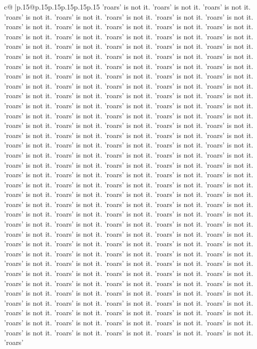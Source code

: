 \documentclass{article}
\begin{document}
{\begin{supertabular}{c@{$\;$}|p{.15\linewidth}@{}p{.15\linewidth}p{.15\linewidth}p{.15\linewidth}p{.15\linewidth}p{.15\linewidth}}
{{{'roars' is not it. 'roars' is not it. 'roars' is not it. 'roars' is not it. 'roars' is not it. 'roars' is not it. 'roars' is not it. 'roars' is not it. 'roars' is not it. 'roars' is not it. 'roars' is not it. 'roars' is not it. 'roars' is not it. 'roars' is not it. 'roars' is not it. 'roars' is not it. 'roars' is not it. 'roars' is not it. 'roars' is not it. 'roars' is not it. 'roars' is not it. 'roars' is not it. 'roars' is not it. 'roars' is not it. 'roars' is not it. 'roars' is not it. 'roars' is not it. 'roars' is not it. 'roars' is not it. 'roars' is not it. 'roars' is not it. 'roars' is not it. 'roars' is not it. 'roars' is not it. 'roars' is not it. 'roars' is not it. 'roars' is not it. 'roars' is not it. 'roars' is not it. 'roars' is not it. 'roars' is not it. 'roars' is not it. 'roars' is not it. 'roars' is not it. 'roars' is not it. 'roars' is not it. 'roars' is not it. 'roars' is not it. 'roars' is not it. 'roars' is not it. 'roars' is not it. 'roars' is not it. 'roars' is not it. 'roars' is not it. 'roars' is not it. 'roars' is not it. 'roars' is not it. 'roars' is not it. 'roars' is not it. 'roars' is not it. 'roars' is not it. 'roars' is not it. 'roars' is not it. 'roars' is not it. 'roars' is not it. 'roars' is not it. 'roars' is not it. 'roars' is not it. 'roars' is not it. 'roars' is not it. 'roars' is not it. 'roars' is not it. 'roars' is not it. 'roars' is not it. 'roars' is not it. 'roars' is not it. 'roars' is not it. 'roars' is not it. 'roars' is not it. 'roars' is not it. 'roars' is not it. 'roars' is not it. 'roars' is not it. 'roars' is not it. 'roars' is not it. 'roars' is not it. 'roars' is not it. 'roars' is not it. 'roars' is not it. 'roars' is not it. 'roars' is not it. 'roars' is not it. 'roars' is not it. 'roars' is not it. 'roars' is not it. 'roars' is not it. 'roars' is not it. 'roars' is not it. 'roars' is not it. 'roars' is not it. 'roars' is not it. 'roars' is not it. 'roars' is not it. 'roars' is not it. 'roars' is not it. 'roars' is not it. 'roars' is not it. 'roars' is not it. 'roars' is not it. 'roars' is not it. 'roars' is not it. 'roars' is not it. 'roars' is not it. 'roars' is not it. 'roars' is not it. 'roars' is not it. 'roars' is not it. 'roars' is not it. 'roars' is not it. 'roars' is not it. 'roars' is not it. 'roars' is not it. 'roars' is not it. 'roars' is not it. 'roars' is not it. 'roars' is not it. 'roars' is not it. 'roars' is not it. 'roars' is not it. 'roars' is not it. 'roars' is not it. 'roars' is not it. 'roars' is not it. 'roars' is not it. 'roars' is not it. 'roars' is not it. 'roars' is not it. 'roars' is not it. 'roars' is not it. 'roars' is not it. 'roars' is not it. 'roars' is not it. 'roars' is not it. 'roars' is not it. 'roars' is not it. 'roars' is not it. 'roars' is not it. 'roars' is not it. 'roars' is not it. 'roars' is not it. 'roars' is not it. 'roars' is not it. 'roars' is not it. 'roars' is not it. 'roars' is not it. 'roars' is not it. 'roars' is not it. 'roars' is not it. 'roars' is not it. 'roars' is not it. 'roars' is not it. 'roars' is not it. 'roars' is not it. 'roars' is not it. 'roars' is not it. 'roars' is not it. 'roars' is not it. 'roars' is not it. 'roars' }}}
\end{supertabular}}
\end{document}
